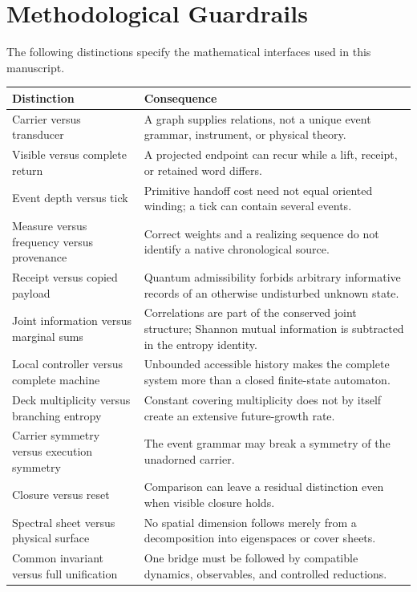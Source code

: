 \Needspace{0.22\textheight}
\section{Methodological Guardrails}

\label{sec:guardrails}
The following distinctions specify the mathematical interfaces used in this manuscript.

\begin{longtable}{@{}p{}p{}@{}}
\toprule
Distinction & Consequence \\
\midrule
\endhead
Carrier versus transducer & A graph supplies relations, not a unique event grammar, instrument, or physical theory. \\
Visible versus complete return & A projected endpoint can recur while a lift, receipt, or retained word differs. \\
Event depth versus tick & Primitive handoff cost need not equal oriented winding; a tick can contain several events. \\
Measure versus frequency versus provenance & Correct weights and a realizing sequence do not identify a native chronological source. \\
Receipt versus copied payload & Quantum admissibility forbids arbitrary informative records of an otherwise undisturbed unknown state. \\
Joint information versus marginal sums & Correlations are part of the conserved joint structure; Shannon mutual information is subtracted in the entropy identity. \\
Local controller versus complete machine & Unbounded accessible history makes the complete system more than a closed finite-state automaton. \\
Deck multiplicity versus branching entropy & Constant covering multiplicity does not by itself create an extensive future-growth rate. \\
Carrier symmetry versus execution symmetry & The event grammar may break a symmetry of the unadorned carrier. \\
Closure versus reset & Comparison can leave a residual distinction even when visible closure holds. \\
Spectral sheet versus physical surface & No spatial dimension follows merely from a decomposition into eigenspaces or cover sheets. \\
Common invariant versus full unification & One bridge must be followed by compatible dynamics, observables, and controlled reductions. \\

\end{longtable}
